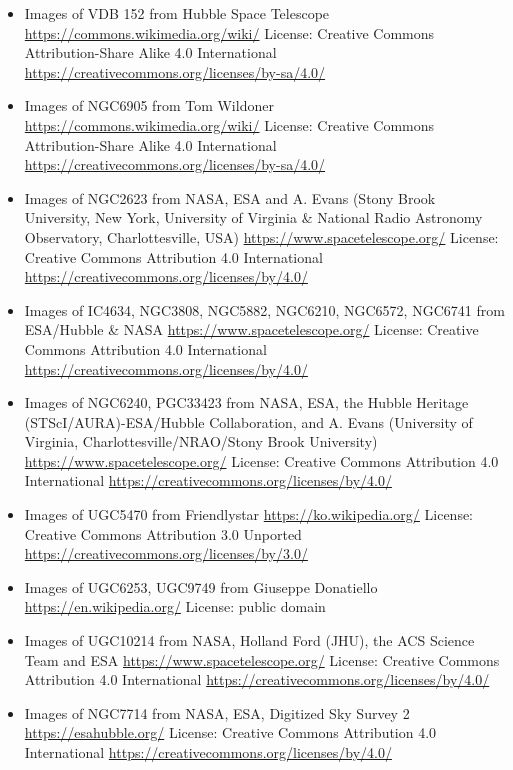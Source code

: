 \begin{itemize}
	 from Rogelio Bernal Andreo
	 \url{https://commons.wikimedia.org/wiki/}
	 License: Creative Commons Attribution-Share Alike 3.0 Unported \url{https://creativecommons.org/licenses/by-sa/3.0/}
\item Images of VDB 152
	 from Hubble Space Telescope
	 \url{https://commons.wikimedia.org/wiki/}
	 License: Creative Commons Attribution-Share Alike 4.0 International \url{https://creativecommons.org/licenses/by-sa/4.0/}
\item Images of NGC6905
	 from Tom Wildoner
	 \url{https://commons.wikimedia.org/wiki/}
	 License: Creative Commons Attribution-Share Alike 4.0 International \url{https://creativecommons.org/licenses/by-sa/4.0/}
\item Images of NGC2623
	 from NASA, ESA and A. Evans (Stony Brook University, New York, University of Virginia \& National Radio Astronomy Observatory, Charlottesville, USA)
	 \url{https://www.spacetelescope.org/}
	 License: Creative Commons Attribution 4.0 International \url{https://creativecommons.org/licenses/by/4.0/}
\item Images of IC4634, NGC3808, NGC5882, NGC6210, NGC6572, NGC6741
	 from ESA/Hubble \& NASA
	 \url{https://www.spacetelescope.org/}
	 License: Creative Commons Attribution 4.0 International \url{https://creativecommons.org/licenses/by/4.0/}
\item Images of NGC6240, PGC33423
	 from NASA, ESA, the Hubble Heritage (STScI/AURA)-ESA/Hubble Collaboration, and A. Evans (University of Virginia, Charlottesville/NRAO/Stony Brook University)
	 \url{https://www.spacetelescope.org/}
	 License: Creative Commons Attribution 4.0 International \url{https://creativecommons.org/licenses/by/4.0/}
\item Images of UGC5470
	 from Friendlystar
	 \url{https://ko.wikipedia.org/}
	 License: Creative Commons Attribution 3.0 Unported \url{https://creativecommons.org/licenses/by/3.0/}
\item Images of UGC6253, UGC9749
	 from Giuseppe Donatiello
	 \url{https://en.wikipedia.org/}
	 License: public domain
\item Images of UGC10214
	 from NASA, Holland Ford (JHU), the ACS Science Team and ESA
	 \url{https://www.spacetelescope.org/}
	 License: Creative Commons Attribution 4.0 International \url{https://creativecommons.org/licenses/by/4.0/}
\item Images of NGC7714
	 from NASA, ESA, Digitized Sky Survey 2
	 \url{https://esahubble.org/}
	 License: Creative Commons Attribution 4.0 International \url{https://creativecommons.org/licenses/by/4.0/}

\end{itemize}
